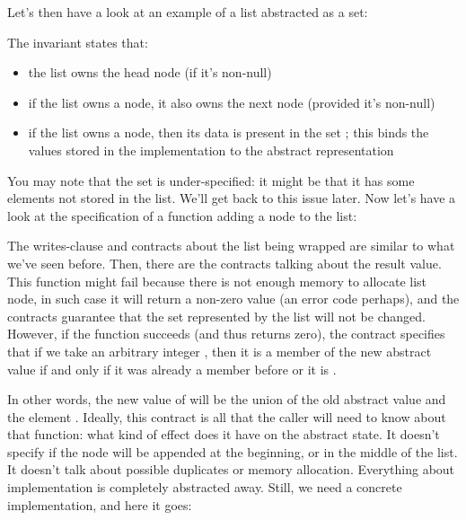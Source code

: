 Let's then have a look at an example of a list abstracted as a set:


\noindent
The invariant states that:
\begin{itemize}
\item the list owns the head node (if it's non-null)
\item if the list owns a node, it also owns the next node (provided it's non-null)
\item if the list owns a node, then its data is present in the set ;
      this binds the values stored in the implementation to the abstract representation
\end{itemize}
You may note that the set  is under-specified: 
it might be that it has some elements not stored in the list.
We'll get back to this issue later.
Now let's have a look at the specification of a function adding a
node to the list:


\noindent
The writes-clause and contracts about the list being wrapped are similar to what
we've seen before.
Then, there are the contracts talking about the result value.
This function might fail because there is not enough memory to allocate list node,
in such case it will return a non-zero value (an error code perhaps),
and the contracts guarantee that the set represented by the list will not be changed.
However, if the function succeeds (and thus returns zero), the contract specifies
that if we take an arbitrary integer , then it is a member of the new abstract
value if and only if it was already a member before or it is .

In other words, the new value of  will be the union of the old
abstract value and the element .
Ideally, this contract is all that the caller will need to know about that function:
what kind of effect does it have on the abstract state. 
It doesn't specify if the node will be appended at the beginning, or in the middle
of the list.
It doesn't talk about possible duplicates or memory allocation.
Everything about implementation is completely abstracted away.
Still, we need a concrete implementation, and here it goes:


